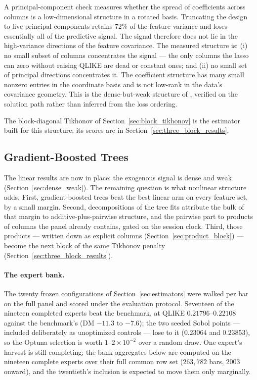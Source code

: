 A principal-component check measures whether the spread of coefficients
across columns is a low-dimensional structure in a rotated basis.
Truncating the design to five principal components retains $72\%$ of the
feature variance and loses essentially all of the predictive signal. The
signal therefore does not lie in the high-variance directions of the
feature covariance. The measured structure is: (i) no small subset of
columns concentrates the signal --- the only columns the lasso can zero
without raising QLIKE are dead or constant ones; and (ii) no small set of
principal directions concentrates it. The coefficient structure has many
small nonzero entries in the coordinate basis and is not low-rank in the
data's covariance geometry. This is the dense-but-weak structure of
\citet{GiannoneLenzaPrimiceri2021}, verified on the solution path
rather than inferred from the loss ordering.

The block-diagonal Tikhonov of Section~\ref{sec:block_tikhonov} is the
estimator built for this structure; its scores are in
Section~\ref{sec:three_block_results}.

\subsection{Gradient-Boosted Trees}
\label{sec:tree_edge}

The linear results are now in place: the exogenous signal is dense and
weak (Section~\ref{sec:dense_weak}). The remaining question is what
nonlinear structure adds. First, gradient-boosted trees beat the best
linear arm on every feature set, by a small margin. Second,
decompositions of the tree fits attribute the bulk of that margin to
additive-plus-pairwise structure, and the pairwise part to products of
columns the panel already contains, gated on the session clock. Third,
those products --- written down as explicit columns
(Section~\ref{sec:product_block}) --- become the next block of the
same Tikhonov penalty (Section~\ref{sec:three_block_results}).

\paragraph{The expert bank.} The twenty frozen configurations of
Section~\ref{sec:estimators} were walked per bar on the full panel and
scored under the evaluation protocol. Seventeen of the nineteen
completed experts beat the benchmark, at QLIKE $0.21796$--$0.22108$
against the benchmark's \unifAzeroQLIKE{} (DM $-11.3$ to $-7.6$); the
two seeded Sobol points --- included deliberately as unoptimized
controls --- lose to it ($0.23064$ and $0.23853$), so the Optuna
selection is worth $1$--$2 \times 10^{-2}$ over a random draw. One
expert's harvest is still completing; the bank aggregates below are
computed on the nineteen complete experts over their full common row
set ($263{,}782$ bars, 2003 onward), and the twentieth's inclusion is
expected to move them only marginally.

